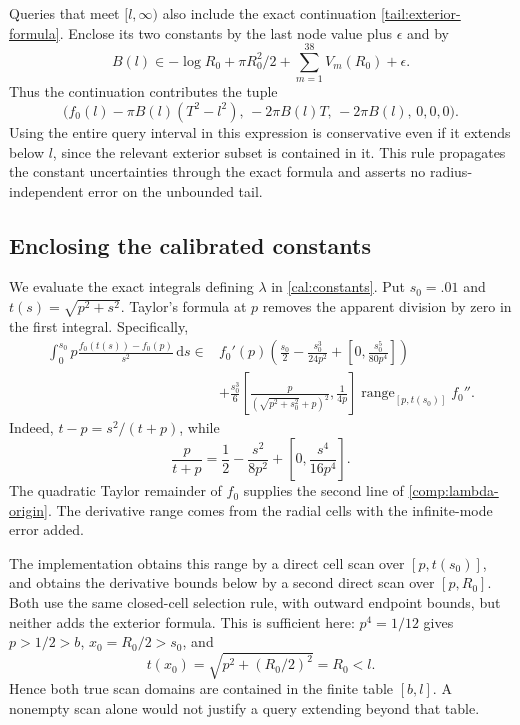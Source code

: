 Queries that meet $[l,\infty)$ also include the exact continuation
\eqref{tail:exterior-formula}.  Enclose its two constants by the
last node value plus $\epsilon$ and by
\begin{equation}\label{comp:constant-B}
 B(l)\in-\log R_0+\pi R_0^2/2+
                    \sum_{m=1}^{38}V_m(R_0)+\epsilon.
\end{equation}
Thus the continuation contributes the tuple
\begin{equation}\label{comp:tail-tuple}
 \bigl(f_0(l)-\pi B(l)(T^2-l^2),\,
       -2\pi B(l)T,\,-2\pi B(l),\,0,0,0\bigr).
\end{equation}
Using the entire query interval in this expression is conservative
even if it extends below $l$, since the relevant exterior subset is
contained in it.  This rule propagates the constant uncertainties
through the exact formula and asserts no radius-independent error
on the unbounded tail.

\subsection{Enclosing the calibrated constants}
\label{comp:constants}

We evaluate the exact integrals defining $\lambda$ in
\eqref{cal:constants}.  Put $s_0=.01$ and
$t(s)=\sqrt{p^2+s^2}$.  Taylor's formula at $p$ removes the apparent
division by zero in the first integral.  Specifically,
\begin{equation}\label{comp:lambda-origin}
 \begin{split}
 \int_0^{s_0}p\frac{f_0(t(s))-f_0(p)}{s^2}\,\mathrm ds
 \in{}& f_0'(p)\left(\frac{s_0}{2}
           -\frac{s_0^3}{24p^2}
                      +\left[0,\frac{s_0^5}{80p^4}\right]\right)\\
 &+\frac{s_0^3}{6}
   \left[\frac{p}{(\sqrt{p^2+s_0^2}+p)^2},\frac1{4p}\right]
          \operatorname{range}_{[p,t(s_0)]} f_0''.
 \end{split}
\end{equation}
Indeed, $t-p=s^2/(t+p)$, while
\[
 \frac{p}{t+p}=\frac12-\frac{s^2}{8p^2}
                         +\left[0,\frac{s^4}{16p^4}\right].
\]
The quadratic Taylor remainder of $f_0$ supplies the second line of
\eqref{comp:lambda-origin}.  The derivative range comes from the
radial cells with the infinite-mode error added.

The implementation obtains this range by a direct cell scan over
$[p,t(s_0)]$, and obtains the derivative bounds below by a second
direct scan over $[p,R_0]$.  Both use the same closed-cell selection
rule, with outward endpoint bounds, but neither adds the exterior
formula.  This is sufficient here: $p^4=1/12$ gives $p>1/2>b$,
$x_0=R_0/2>s_0$, and
\[
              t(x_0)=\sqrt{p^2+(R_0/2)^2}=R_0<l.
\]
Hence both true scan domains are contained in the finite table
$[b,l]$.  A nonempty scan alone would not justify a query extending
beyond that table.

